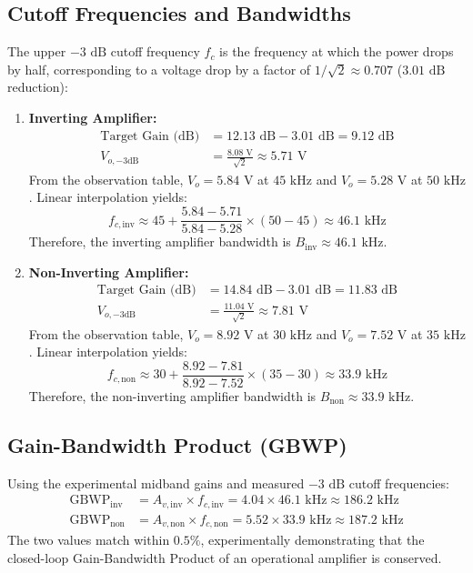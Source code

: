 \documentclass[12pt,a4paper]{article}
\begin{document}
\subsection{Cutoff Frequencies and Bandwidths}
The upper $-3\text{ dB}$ cutoff frequency $f_c$ is the frequency at which the power drops by half, corresponding to a voltage drop by a factor of $1/\sqrt{2} \approx 0.707$ ($3.01\text{ dB}$ reduction):
\begin{enumerate}
    \item \textbf{Inverting Amplifier:}
    \begin{align}
        \text{Target Gain (dB)} &= 12.13\text{ dB} - 3.01\text{ dB} = 9.12\text{ dB} \\
        V_{o,-3\text{dB}} &= \frac{8.08\text{ V}}{\sqrt{2}} \approx 5.71\text{ V}
    \end{align}
    From the observation table, $V_o = 5.84\text{ V}$ at $45\text{ kHz}$ and $V_o = 5.28\text{ V}$ at $50\text{ kHz}$. Linear interpolation yields:
    \begin{equation}
        f_{c,\text{inv}} \approx 45 + \frac{5.84 - 5.71}{5.84 - 5.28} \times (50 - 45) \approx 46.1\text{ kHz}
    \end{equation}
    Therefore, the inverting amplifier bandwidth is $B_{\text{inv}} \approx 46.1\text{ kHz}$.
    
    \item \textbf{Non-Inverting Amplifier:}
    \begin{align}
        \text{Target Gain (dB)} &= 14.84\text{ dB} - 3.01\text{ dB} = 11.83\text{ dB} \\
        V_{o,-3\text{dB}} &= \frac{11.04\text{ V}}{\sqrt{2}} \approx 7.81\text{ V}
    \end{align}
    From the observation table, $V_o = 8.92\text{ V}$ at $30\text{ kHz}$ and $V_o = 7.52\text{ V}$ at $35\text{ kHz}$. Linear interpolation yields:
    \begin{equation}
        f_{c,\text{non}} \approx 30 + \frac{8.92 - 7.81}{8.92 - 7.52} \times (35 - 30) \approx 33.9\text{ kHz}
    \end{equation}
    Therefore, the non-inverting amplifier bandwidth is $B_{\text{non}} \approx 33.9\text{ kHz}$.
\end{enumerate}

\subsection{Gain-Bandwidth Product (GBWP)}
Using the experimental midband gains and measured $-3\text{ dB}$ cutoff frequencies:
\begin{align}
    \text{GBWP}_{\text{inv}} &= A_{v,\text{inv}} \times f_{c,\text{inv}} = 4.04 \times 46.1\text{ kHz} \approx 186.2\text{ kHz} \\
    \text{GBWP}_{\text{non}} &= A_{v,\text{non}} \times f_{c,\text{non}} = 5.52 \times 33.9\text{ kHz} \approx 187.2\text{ kHz}
\end{align}
The two values match within $0.5\%$, experimentally demonstrating that the closed-loop Gain-Bandwidth Product of an operational amplifier is conserved.
\end{document}
